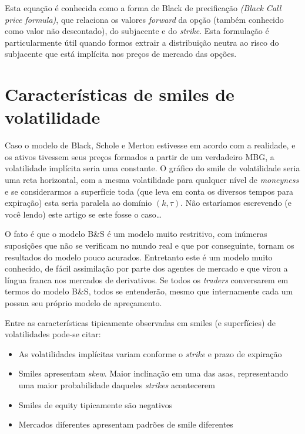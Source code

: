 \documentclass[]{book}
\providecommand{\tightlist}{%
  \setlength{\itemsep}{0pt}\setlength{\parskip}{0pt}}
\begin{document}
Esta equação é conhecida como a forma de Black de precificação
\emph{(Black Call price formula)}, que relaciona os valores
\emph{forward} da opção (também conhecido como valor não descontado), do
subjacente e do \emph{strike}. Esta formulação é particularmente útil
quando formos extrair a distribuição neutra ao risco do subjacente que
está implícita nos preços de mercado das opções.

\section{Características de smiles de volatilidade}\label{caracsmile}

Caso o modelo de Black, Schole e Merton estivesse em acordo com a
realidade, e os ativos tivessem seus preços formados a partir de um
verdadeiro MBG, a volatilidade implícita seria uma constante. O gráfico
do smile de volatilidade seria uma reta horizontal, com a mesma
volatilidade para qualquer nível de \emph{moneyness} e se considerarmos
a superfície toda (que leva em conta os diversos tempos para expiração)
esta seria paralela ao domínio \((k, \tau)\). Não estaríamos escrevendo
(e você lendo) este artigo se este fosse o caso\ldots{}

O fato é que o modelo B\&S é um modelo muito restritivo, com inúmeras
suposições que não se verificam no mundo real e que por conseguinte,
tornam os resultados do modelo pouco acurados. Entretanto este é um
modelo muito conhecido, de fácil assimilação por parte dos agentes de
mercado e que virou a língua franca nos mercados de derivativos. Se
todos os \emph{traders} conversarem em termos do modelo B\&S, todos se
entenderão, mesmo que internamente cada um possua seu próprio modelo de
apreçamento.

Entre as características tipicamente observadas em smiles (e
superfícies) de volatilidades pode-se citar:

\begin{itemize}
\tightlist
\item
  As volatilidades implícitas variam conforme o \emph{strike} e prazo de
  expiração
\item
  Smiles apresentam \emph{skew}. Maior inclinação em uma das asas,
  representando uma maior probabilidade daqueles \emph{strikes}
  acontecerem
\item
  Smiles de equity tipicamente são negativos
\item
  Mercados diferentes apresentam padrões de smile diferentes
\end{itemize}
\end{document}
